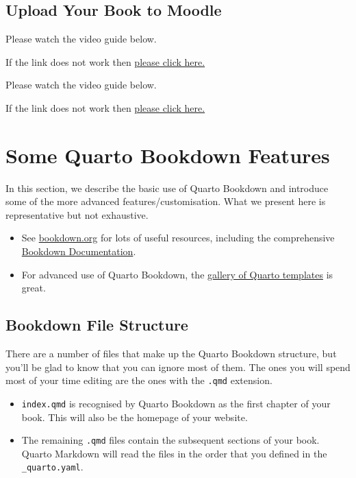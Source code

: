 \documentclass[
  letterpaper,
  oneside]{book}
\numberwithin{equation}{section}
\numberwithin{figure}{section}
\theoremstyle{break}
\theoremstyle{plain}
\theoremstyle{remark}
\begin{document}
\section{Upload Your Book to Moodle}\label{upload-your-book-to-moodle}

Please watch the video guide below.

If the link does not work then
\href{https://mediaspace.nottingham.ac.uk/media/How+to+upload+R+bookdown+file+to+Moodle/1_la5eitil}{please
click here.}

Please watch the video guide below.

If the link does not work then
\href{https://mediaspace.nottingham.ac.uk/media/Clip+of+How+to+upload+R+Bookdown+html+to+Moodle/1_9hm74lrs}{please
click here.}


\chapter{Some Quarto Bookdown
Features}\label{some-quarto-bookdown-features}

In this section, we describe the basic use of Quarto Bookdown and
introduce some of the more advanced features/customisation. What we
present here is representative but not exhaustive.

\begin{itemize}
\item
  See \href{https://quarto.org/?target=_blank}{bookdown.org} for lots of
  useful resources, including the comprehensive
  \href{https://quarto.org/docs/guide/?target=_blank}{Bookdown
  Documentation}.
\item
  For advanced use of Quarto Bookdown, the
  \href{https://quarto.org/docs/gallery/?target=_blank}{gallery of
  Quarto templates} is great.
\end{itemize}

\section{Bookdown File Structure}\label{bookdown-file-structure}

There are a number of files that make up the Quarto Bookdown structure,
but you'll be glad to know that you can ignore most of them. The ones
you will spend most of your time editing are the ones with the
\texttt{.qmd} extension.

\begin{itemize}
\item
  \texttt{index.qmd} is recognised by Quarto Bookdown as the first
  chapter of your book. This will also be the homepage of your website.
\item
  The remaining \texttt{.qmd} files contain the subsequent sections of
  your book. Quarto Markdown will read the files in the order that you
  defined in the \texttt{\_quarto.yaml}.
\end{itemize}
\end{document}
